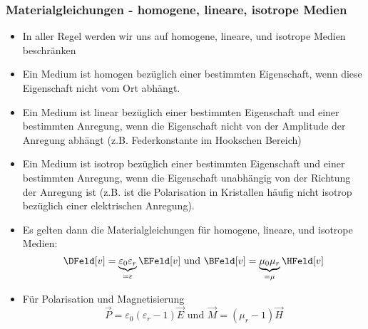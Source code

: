        \begin{frame}
         \frametitle{Materialgleichungen - homogene, lineare, isotrope
           Medien}
         \begin{itemize}[<+->]
           \item In aller Regel werden wir uns auf \alert{homogene,
               lineare, und isotrope Medien} beschränken
             \item Ein Medium ist \alert{homogen} bezüglich einer
               bestimmten Eigenschaft, wenn diese Eigenschaft nicht
               vom \alert{Ort} abhängt. 
               \item Ein Medium ist \alert{linear} bezüglich einer
                 bestimmten Eigenschaft und einer bestimmten Anregung,
                 wenn die Eigenschaft nicht von der \alert{Amplitude} der
                 Anregung abhängt (z.B. Federkonstante im Hookschen
                 Bereich)
                 \item Ein Medium ist \alert{isotrop} bezüglich einer
                   bestimmten Eigenschaft und einer bestimmten
                   Anregung, wenn die Eigenschaft unabhängig von der
                   \alert{Richtung} der Anregung ist (z.B. ist die
                   Polarisation in Kristallen häufig nicht isotrop
                   bezüglich einer elektrischen Anregung).
                   \item Es gelten dann die
                     \alert{Materialgleichungen für homogene,
                       lineare, und isotrope Medien}:
                     $$ \DFeld[v] =
                     \underbrace{\varepsilon_0\varepsilon_r}_{=\varepsilon}
                     \EFeld[v] \text{ und } \BFeld[v] =
                     \underbrace{\mu_0  \mu_r}_{=\mu} \HFeld[v] $$
                   \item Für Polarisation und Magnetisierung
              $$\vec{P} = \varepsilon_0(\varepsilon_r - 1) \vec{E}
              \text{ und }  \vec{M} = (\mu_r-1) \vec{H}$$
           \end{itemize}
         \end{frame}

